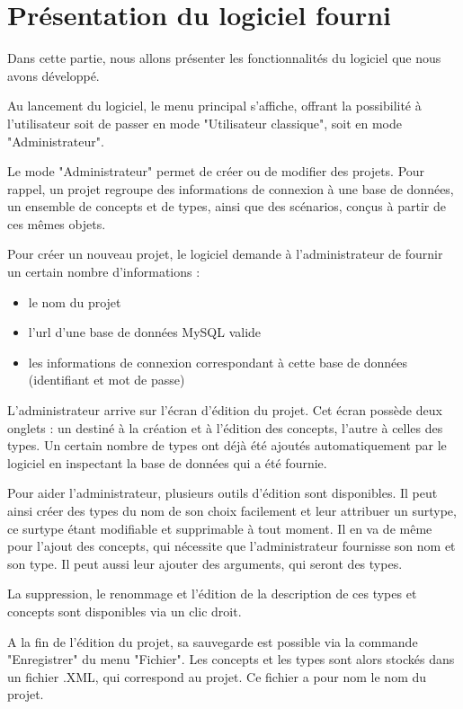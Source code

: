 \documentclass[12pt]{report}
\begin{document}
\chapter{Présentation du logiciel fourni}

Dans cette partie, nous allons présenter les fonctionnalités du logiciel que nous avons développé.

Au lancement du logiciel, le menu principal s'affiche, offrant la possibilité à l'utilisateur soit de passer en mode "Utilisateur classique", soit en mode "Administrateur".
 \bigskip 

Le mode "Administrateur" permet de créer ou de modifier des projets. Pour rappel, un projet regroupe des informations de connexion à une base de données, un ensemble de concepts et de types, ainsi que des scénarios, conçus à partir de ces mêmes objets.

Pour créer un nouveau projet, le logiciel demande à l'administrateur de fournir un certain nombre d'informations : 
\begin{itemize}
\item le nom du projet
\item l'url d'une base de données MySQL valide
\item les informations de connexion correspondant à cette base de données (identifiant et mot de passe)
\end{itemize}

\bigskip

L'administrateur arrive sur l'écran d'édition du projet.
Cet écran possède deux onglets : un destiné à la création et à l'édition des concepts, l'autre à celles des types. Un certain nombre de types ont déjà été ajoutés automatiquement par le logiciel en inspectant la base de données qui a été fournie.

\bigskip

Pour aider l'administrateur, plusieurs outils d'édition sont disponibles.
Il peut ainsi créer des types du nom de son choix facilement et leur attribuer un surtype, ce surtype étant modifiable et supprimable à tout moment. 
Il en va de même pour l'ajout des concepts, qui nécessite que l'administrateur fournisse son nom et son type. Il peut aussi leur ajouter des arguments, qui seront des types.

La suppression, le renommage et l'édition de la description de ces types et concepts sont disponibles via un clic droit.

\bigskip

A la fin de l'édition du projet, sa sauvegarde est possible via la commande "Enregistrer" du menu "Fichier". Les concepts et les types sont alors stockés dans un fichier .XML, qui correspond au projet. Ce fichier a pour nom le nom du projet.
\end{document}
